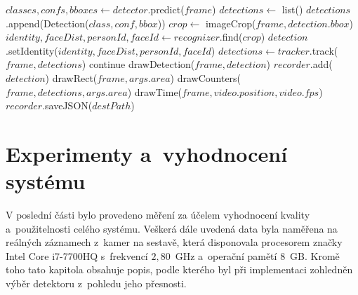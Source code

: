 \begin{algorithm}
\begin{algorithmic}[1]
    \State
     
        \State $classes, confs, bboxes \gets detector$.predict($frame$) 
        \State $detections \gets$ list()
            \State $detections$.append(Detection($class, conf, bbox$))
        \EndFor
            
                    \State $crop \gets$ imageCrop($frame, detection.bbox$)
                    \State $identity, faceDist, personId, faceId \gets recognizer$.find($crop$)
                    \State $detection$.setIdentity($identity, faceDist, personId, faceId$)
                \EndIf
            \EndFor
        \EndIf
            
            \State $detections \gets tracker$.track($frame, detections$)
        \EndIf
           
                \State continue
            \EndIf
                    \State drawDetection($frame, detection$)
                    \State $recorder$.add($detection$)
                \EndIf
            \EndIf
        \EndFor
         
            \State drawRect($frame, args.area$)
        \EndIf
         
            \State drawCounters($frame, detections, args.area$)
        \EndIf
         
            \State drawTime($frame, video.position, video.fps$)
        \EndIf
    \EndFor
    \State $recorder$.saveJSON($destPath$)
\EndProcedure
\end{algorithmic}
\end{algorithm}


\chapter{Experimenty a~vyhodnocení systému}
\label{kap:experimenty}
V poslední části bylo provedeno měření za účelem vyhodnocení kvality a~použitelnosti celého systému. Veškerá dále uvedená data byla naměřena na reálných záznamech z~kamer na sestavě, která disponovala procesorem značky Intel Core i7-7700HQ s~frekvencí $2,80$~GHz a~operační pamětí $8$~GB. Kromě toho tato kapitola obsahuje popis, podle kterého byl při implementaci zohledněn výběr detektoru z~pohledu jeho přesnosti.

